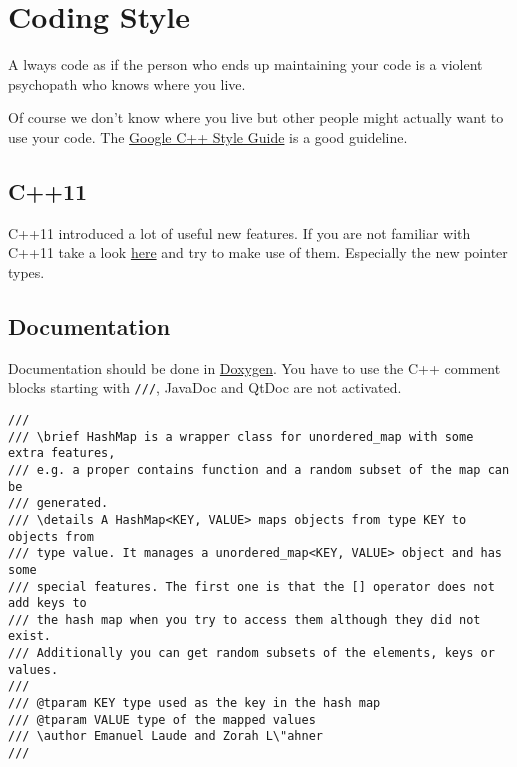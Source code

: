 
\chapter{Coding Style}

\begin{mdframed}
\lettrine{A}{} lways code as if the person who ends up maintaining your code is a violent psychopath who knows where you live.
\end{mdframed}

Of course we don't know where you live but other people might actually want to use your code. The \href{http://google-styleguide.googlecode.com/svn/trunk/cppguide.html}{Google C++ Style Guide} is a good guideline. 

\section{C++11}

C++11 introduced a lot of useful new features. If you are not familiar with C++11 take a look \href{http://www.codeproject.com/Articles/570638/Ten-Cplusplus-Features-Every-Cplusplus-Developer}{here} and try to make use of them. Especially the new pointer types. 

\section{Documentation}

Documentation should be done in \href{http://www.stack.nl/~dimitri/doxygen/}{Doxygen}. You have to use the C++ comment blocks starting with \texttt{///}, JavaDoc and QtDoc are not activated. 

\begin{lstlisting}
///
/// \brief HashMap is a wrapper class for unordered_map with some extra features,
/// e.g. a proper contains function and a random subset of the map can be 
/// generated.
/// \details A HashMap<KEY, VALUE> maps objects from type KEY to objects from 
/// type value. It manages a unordered_map<KEY, VALUE> object and has some 
/// special features. The first one is that the [] operator does not add keys to 
/// the hash map when you try to access them although they did not exist. 
/// Additionally you can get random subsets of the elements, keys or values.
///
/// @tparam KEY type used as the key in the hash map
/// @tparam VALUE type of the mapped values
/// \author Emanuel Laude and Zorah L\"ahner
///
\end{lstlisting}

